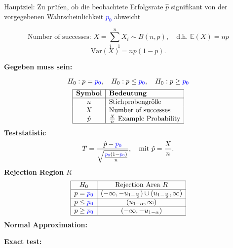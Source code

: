 Hauptziel: Zu prüfen, ob die beobachtete Erfolgsrate $\hat{p}$ signifikant von der vorgegebenen Wahrscheinlichkeit \textcolor{blue}{$p_0$} abweicht
\begin{center}
$$
\text{Number of successes: } X = \sum_{i=1}^n X_i \sim B(n, p), \quad \text{d.h. } \mathbb{E}(X) = np
$$$$
\text{Var}(X) = np(1-p).
$$
\end{center}
\large{\textbf{Gegeben muss sein:}}

\[
H_0: p = \textcolor{blue}{\textcolor{blue}{p_0}}, \quad H_0: p \leq \textcolor{blue}{p_0}, \quad H_0: p \geq \textcolor{blue}{p_0}
\]
\[
\begin{array}{|c|l|}
\hline
\textbf{Symbol} & \textbf{Bedeutung} \\
\hline
n& \text{Stichprobengröße} \\
X & \text{Number of successes} \\
\hat{p}& \frac{X}{n} \text{ Example Probability} \\
\hline
\end{array}
\]
\large{\textbf{Teststatistic}}
$$
T = \frac{\hat{p} - \textcolor{blue}{p_0}}{\sqrt{\frac{\textcolor{blue}{p_0}(1-\textcolor{blue}{p_0})}{n}}}, \quad \text{mit } \hat{p} = \frac{X}{n}.
$$
\large{\textbf{Rejection Region $R$}}
\[
\begin{array}{|c|c|}
\hline
H_0 & \text{Rejection Area } R \\ \hline
p = \textcolor{blue}{p_0} & (-\infty, -u_{1-\frac{\alpha}{2}}) \cup (u_{1-\frac{\alpha}{2}}, \infty) \\ \hline
p \leq \textcolor{blue}{p_0} & (u_{1-\alpha}, \infty) \\ \hline
p \geq \textcolor{blue}{p_0} & (-\infty, -u_{1-\alpha}) \\ \hline
\end{array}
\]
\large{\textbf{Normal Approximation:}}
\large{\textbf{Exact test:}}
